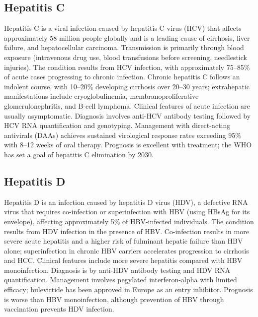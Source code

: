 \subsection{Hepatitis C}
\label{sec:Hepatitis C}
Hepatitis C is a viral infection caused by hepatitis C virus (HCV) that affects approximately 58 million people globally and is a leading cause of cirrhosis, liver failure, and hepatocellular carcinoma. Transmission is primarily through blood exposure (intravenous drug use, blood transfusions before screening, needlestick injuries). The condition results from HCV infection, with approximately 75--85\% of acute cases progressing to chronic infection. Chronic hepatitis C follows an indolent course, with 10--20\% developing cirrhosis over 20--30 years; extrahepatic manifestations include cryoglobulinemia, membranoproliferative glomerulonephritis, and B-cell lymphoma. Clinical features of acute infection are usually asymptomatic. Diagnosis involves anti-HCV antibody testing followed by HCV RNA quantification and genotyping. Management with direct-acting antivirals (DAAs) achieves sustained virological response rates exceeding 95\% with 8--12 weeks of oral therapy. Prognosis is excellent with treatment; the WHO has set a goal of hepatitis C elimination by 2030.

\subsection{Hepatitis D}
\label{sec:Hepatitis D}
Hepatitis D is an infection caused by hepatitis D virus (HDV), a defective RNA virus that requires co-infection or superinfection with HBV (using HBsAg for its envelope), affecting approximately 5\% of HBV-infected individuals. The condition results from HDV infection in the presence of HBV. Co-infection results in more severe acute hepatitis and a higher risk of fulminant hepatic failure than HBV alone; superinfection in chronic HBV carriers accelerates progression to cirrhosis and HCC. Clinical features include more severe hepatitis compared with HBV monoinfection. Diagnosis is by anti-HDV antibody testing and HDV RNA quantification. Management involves pegylated interferon-alpha with limited efficacy; bulevirtide has been approved in Europe as an entry inhibitor. Prognosis is worse than HBV monoinfection, although prevention of HBV through vaccination prevents HDV infection.

